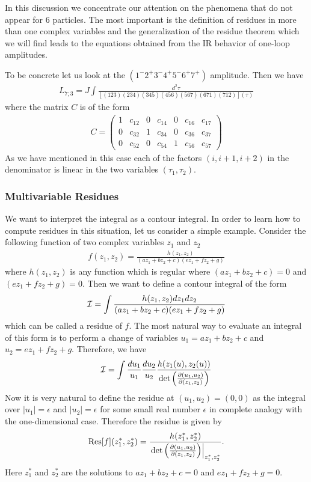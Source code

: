 \documentclass[12pt]{article}
\newcommand{\del}{\partial}
\newcommand{\be}{\begin{eqnarray}}
\newcommand{\ee}{\end{eqnarray}}
\begin{document}
In this discussion we concentrate our attention on the phenomena that do not appear for $6$ particles. The most important is the definition of residues in more than one complex variables and the generalization of the residue theorem which we will find leads to the equations obtained from the IR behavior of one-loop amplitudes.

To be concrete let us look at the $(1^- 2^+ 3^- 4^+ 5^- 6^+ 7^+)$ amplitude. Then we have
\be
\label{sev}
L_{7;3} = J
\int \frac{d^2 \tau}{\left[(123)(234)(345)(456)(567)(671)(712)\right](\tau)}
\ee
where the matrix $C$ is of the form
\be
C = \left(\begin{array}{ccccccc} 1 & c_{12} & 0 & c_{14} & 0 & c_{16} & c_{17} \\ 0 &
c_{32} & 1 & c_{34} & 0 & c_{36} & c_{37} \\ 0 & c_{52} & 0 & c_{54} &
1 & c_{56} & c_{57} \end{array} \right)
\ee
As we have mentioned in this case each of the factors $(i, i+1 , i+2)$ in the denominator is linear in the two variables $(\tau_1,\tau_2)$.

\subsubsection{Multivariable Residues}

We want to interpret the integral as a contour integral.
In order to learn how to compute residues in this situation, let us consider a simple example. Consider the following function of two complex variables $z_1$ and $z_2$
%
\be
f(z_1,z_2) = \frac{h(z_1,z_2)}{(a z_1+b z_2 + c)(e z_1+f z_2 + g)}
\ee
where $h(z_1,z_2)$ is any function which is regular where $(a z_1+b z_2 + c)=0$ and $(e z_1+f z_2 + g)=0$.
Then we want to define a contour integral of the form
%
\be
{\cal I} = \int \frac{h(z_1,z_2) dz_1dz_2}{(a z_1+b z_2 + c)(e z_1+f z_2 + g)}
\ee
%
which can be called a residue of $f$. The most natural way to evaluate an integral of this form is to perform a change of variables $u_1 = a z_1+b z_2 + c$ and $u_2=e z_1+f z_2 + g$. Therefore, we have
%
\be
{\cal I} = \int \frac{du_1}{u_1}\frac{du_2}{u_2}\frac{h(z_1(u),z_2(u))}{{\rm det}\left(\frac{\del(u_1,u_2)}{\del (z_1,z_2)}\right)}
\ee
%
Now it is very natural to define the residue at $(u_1,u_2)=(0,0)$ as the integral over $|u_1| = \epsilon$ and $|u_2|=\epsilon$ for some small real number $\epsilon$ in complete analogy with the one-dimensional case. Therefore the residue is given by
%
\be
{\rm Res}[f](z_1^*,z_2^*) =  \frac{h(z_1^*,z_2^*)}{\left. {\rm det}\left(\frac{\del(u_1,u_2)}{\del (z_1,z_2)}\right)\right|_{z_1^*,z_2^*}} .
\ee
%
Here $z_1^*$ and $z_2^*$ are the solutions to $a z_1+b z_2 + c = 0$ and $e z_1+f z_2 + g = 0$.
\end{document}
